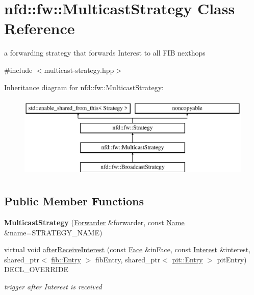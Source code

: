 \hypertarget{classnfd_1_1fw_1_1MulticastStrategy}{}\section{nfd\+:\+:fw\+:\+:Multicast\+Strategy Class Reference}
\label{classnfd_1_1fw_1_1MulticastStrategy}


a forwarding strategy that forwards Interest to all F\+IB nexthops  




{\ttfamily \#include $<$multicast-\/strategy.\+hpp$>$}

Inheritance diagram for nfd\+:\+:fw\+:\+:Multicast\+Strategy\+:\begin{figure}[H]
\begin{center}
\leavevmode
\includegraphics[height=4.000000cm]{classnfd_1_1fw_1_1MulticastStrategy}
\end{center}
\end{figure}
\subsection*{Public Member Functions}
\begin{DoxyCompactItemize}
\item 
{\bfseries Multicast\+Strategy} (\hyperlink{classnfd_1_1Forwarder}{Forwarder} \&forwarder, const \hyperlink{classndn_1_1Name}{Name} \&name=S\+T\+R\+A\+T\+E\+G\+Y\+\_\+\+N\+A\+ME)\hypertarget{classnfd_1_1fw_1_1MulticastStrategy_a377d0417c248b4a25bc655d53471a84b}{}\label{classnfd_1_1fw_1_1MulticastStrategy_a377d0417c248b4a25bc655d53471a84b}

\item 
virtual void \hyperlink{classnfd_1_1fw_1_1MulticastStrategy_a3dede97a8433b762348568de7d7ae122}{after\+Receive\+Interest} (const \hyperlink{classnfd_1_1Face}{Face} \&in\+Face, const \hyperlink{classndn_1_1Interest}{Interest} \&interest, shared\+\_\+ptr$<$ \hyperlink{classnfd_1_1fib_1_1Entry}{fib\+::\+Entry} $>$ fib\+Entry, shared\+\_\+ptr$<$ \hyperlink{classnfd_1_1pit_1_1Entry}{pit\+::\+Entry} $>$ pit\+Entry) D\+E\+C\+L\+\_\+\+O\+V\+E\+R\+R\+I\+DE
\begin{DoxyCompactList}\small\item\em trigger after Interest is received \end{DoxyCompactList}\end{DoxyCompactItemize}
